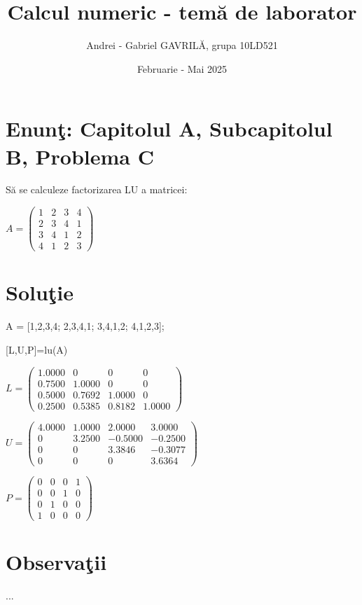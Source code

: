 \documentclass{article}
\begin{document}
\title{Calcul numeric - tem\u{a} de laborator}

\author{Andrei - Gabriel GAVRIL\u{A}, grupa 10LD521}

\date{Februarie - Mai 2025}

\maketitle

\section*{Enun\c{t}: Capitolul A, Subcapitolul B, Problema C}

S\u{a} se calculeze factorizarea LU a matricei:
\begin{center}
$
A=\begin{pmatrix}
1 & 2 & 3 & 4\\
2 & 3 & 4 & 1\\
3 & 4 & 1 & 2\\
4 & 1 & 2 & 3
\end{pmatrix}
$
\end{center}

\section*{Solu\c{t}ie}

\begin{center}
    A = [1,2,3,4; 2,3,4,1; 3,4,1,2; 4,1,2,3];
\end{center}
\begin{center}
    [L,U,P]=lu(A)
\end{center}

\begin{center}
$
L =\begin{pmatrix}

    1.0000  &       0  &       0  &       0\\
    0.7500  &  1.0000  &       0  &       0\\
    0.5000  &  0.7692  &  1.0000  &       0\\
    0.2500  &  0.5385  &  0.8182  &  1.0000
\end{pmatrix}
$
\end{center}

\begin{center}
$
U =\begin{pmatrix}
  4.0000  &  1.0000  &  2.0000  &  3.0000\\
    0  &  3.2500  & -0.5000 &  -0.2500\\
    0  & 0  &  3.3846  & -0.3077\\
    0  & 0  &  0  &  3.6364
\end{pmatrix}
$
\end{center} 

\begin{center}
$
P =\begin{pmatrix}
  0  &   0  &   0   & 1\\
  0  &   0  &   1   &  0\\
  0  &   1  &   0   &  0\\
  1  &   0  &   0   &  0
\end{pmatrix}
$
\end{center}

\section*{Observa\c{t}ii}

...
\end{document}
